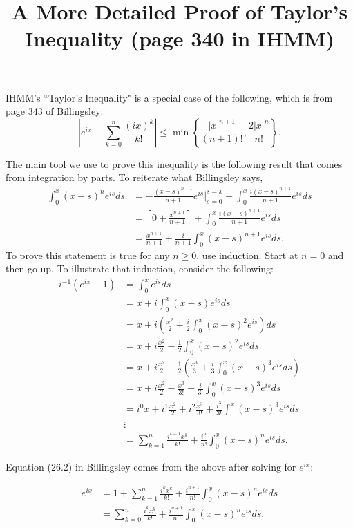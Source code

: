 \documentclass{article}
\title{A More Detailed Proof of Taylor's Inequality (page 340 in IHMM)}
\begin{document}
\maketitle


IHMM's ``Taylor's Inequality" is a special case of the following, which is from page 343 of Billingsley: 
\[
\left|e^{ix} - \sum_{k=0}^n\frac{(ix)^k}{k!}\right| \le \min\left\{\frac{|x|^{n+1} }{(n+1)!}, \frac{2|x|^n}{n!} \right\}.
\]

The main tool we use to prove this inequality is the following result that comes from integration by parts. To reiterate what Billingsley says,
\begin{align*}
\int_0^x (x-s)^n e^{is}ds &= -\frac{(x-s)^{n+1} }{n+1} e^{is} \bigg\rvert_{s=0}^{s=x} + \int_0^x  \frac{i(x-s)^{n+1} }{n+1} e^{is} ds  \\
&= \left[0+ \frac{x^{n+1} }{n+1}\right] + \int_0^x  \frac{i(x-s)^{n+1} }{n+1} e^{is} ds  \\
&=  \frac{x^{n+1} }{n+1} + \frac{i}{n+1}  \int_0^x  (x-s)^{n+1}e^{is} ds.
\end{align*}
To prove this statement is true for any $n \ge 0$, use induction. Start at $n=0$ and then go up. To illustrate that induction, consider the following:
\begin{align*}
i^{-1}(e^{ix}-1) &= \int_0^x  e^{is}ds \\
&= x + i  \int_0^x  (x-s) e^{is} ds \tag{IBP}\\
&= x + i  \left(\frac{x^2}{2} + \frac{i}{2} \int_0^x  (x-s)^2 e^{is} \right) ds \tag{IBP} \\
&= x + i\frac{x^2}{2} - \frac{1}{2} \int_0^x  (x-s)^2 e^{is}  ds  \\
&= x + i\frac{x^2}{2} - \frac{1}{2} \left(  \frac{x^3}{3} +\frac{i}{3} \int_0^x (x-s)^3 e^{is}  ds \right) \tag{IBP}\\
&= x + i\frac{x^2}{2} - \frac{x^3}{3!} - \frac{i}{3!} \int_0^x (x-s)^3 e^{is}  ds \\
&= i^0 x + i^1 \frac{x^2}{2}  + i^2 \frac{x^3}{3!} +  \frac{i^3}{3!} \int_0^x (x-s)^3 e^{is}  ds \\
&\vdots \\
&= \sum_{k=1}^{n} \frac{ i^{k-1}x^k }{k!} + \frac{i^n}{n!}\int_0^x (x-s)^n e^{is}  ds.
\end{align*}

Equation (26.2) in Billingsley comes from the above after solving for $e^{ix}$:

\begin{align*}
e^{ix} &= 1 + \sum_{k=1}^{n} \frac{ i^{k}x^k }{k!} + \frac{i^{n+1} }{n!}\int_0^x (x-s)^n e^{is}  ds \\
&= \sum_{k=0}^{n} \frac{ i^{k}x^k }{k!} + \frac{i^{n+1} }{n!}\int_0^x (x-s)^n e^{is}  ds \tag{1}.
\end{align*}
\end{document}
